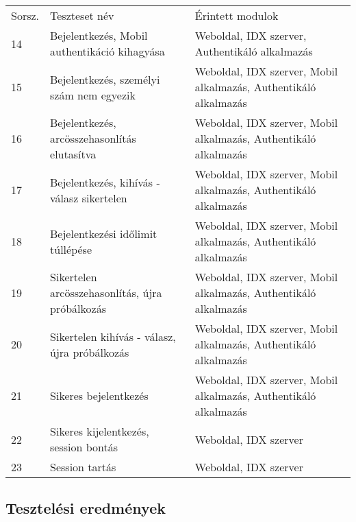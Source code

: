 \begin{tabular}{|p{1cm}|p{8cm} |p{4cm}|}
  \hline
\rowcolor{Title}
\multicolumn{3}{ |c| }{\color{white} Teszteset leírása} \\
  \hline
\rowcolor{Header}
Sorsz. & Teszteset név & Érintett modulok\tabularnewline
\hline 
 
 14  & Bejelentkezés, Mobil authentikáció kihagyása & Weboldal, IDX szerver, Authentikáló alkalmazás \tabularnewline
  \hline
 15  & Bejelentkezés, személyi szám nem egyezik  & Weboldal, IDX szerver, Mobil alkalmazás, Authentikáló alkalmazás \tabularnewline
  \hline
 16  & Bejelentkezés, arcösszehasonlítás elutasítva  & Weboldal, IDX szerver, Mobil alkalmazás, Authentikáló alkalmazás \tabularnewline
  \hline
 17  & Bejelentkezés, kihívás - válasz sikertelen  & Weboldal, IDX szerver, Mobil alkalmazás, Authentikáló alkalmazás \tabularnewline
  \hline
 18  & Bejelentkezési időlimit túllépése  & Weboldal, IDX szerver, Mobil alkalmazás, Authentikáló alkalmazás \tabularnewline
  \hline
 19  & Sikertelen arcösszehasonlítás, újra próbálkozás  & Weboldal, IDX szerver, Mobil alkalmazás, Authentikáló alkalmazás \tabularnewline
  \hline
 20  & Sikertelen kihívás - válasz, újra próbálkozás  & Weboldal, IDX szerver, Mobil alkalmazás, Authentikáló alkalmazás \tabularnewline
  \hline
 21  &Sikeres bejelentkezés  & Weboldal, IDX szerver, Mobil alkalmazás, Authentikáló alkalmazás \tabularnewline
  \hline
 22  &Sikeres kijelentkezés, session bontás  & Weboldal, IDX szerver \tabularnewline
  \hline
 23  & Session tartás  & Weboldal, IDX szerver \tabularnewline
  \hline
\end{tabular}

\subsection{Tesztelési eredmények}

